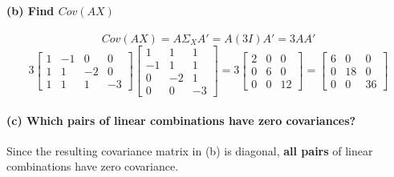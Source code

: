 \documentclass[12pt]{article}
\begin{document}
\paragraph{(b) Find $Cov(AX)$} 
\[
Cov(AX) = A\Sigma_X A' = A(3I)A' = 3AA'
\]
\[
3 \begin{bmatrix} 1 & -1 & 0 & 0 \\ 1 & 1 & -2 & 0 \\ 1 & 1 & 1 & -3 \end{bmatrix} \begin{bmatrix} 1 & 1 & 1 \\ -1 & 1 & 1 \\ 0 & -2 & 1 \\ 0 & 0 & -3 \end{bmatrix} = 3 \begin{bmatrix} 2 & 0 & 0 \\ 0 & 6 & 0 \\ 0 & 0 & 12 \end{bmatrix} = \begin{bmatrix} 6 & 0 & 0 \\ 0 & 18 & 0 \\ 0 & 0 & 36 \end{bmatrix}
\] 

\paragraph{(c) Which pairs of linear combinations have zero covariances?} 
Since the resulting covariance matrix in (b) is diagonal, \textbf{all pairs} of linear combinations have zero covariance. 
\end{document}
